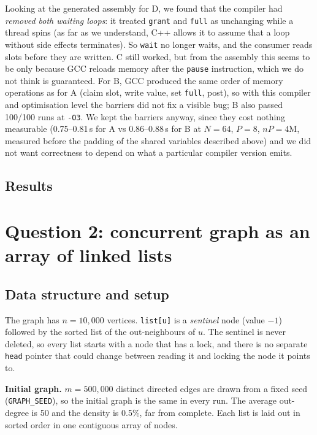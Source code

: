\documentclass[10pt,a4paper]{article}
\begin{document}
Looking at the generated assembly for D, we found that the compiler had \emph{removed both waiting loops}: it treated \texttt{grant} and \texttt{full}
as unchanging while a thread spins (as far as we understand, C++ allows it to assume that a loop without side effects terminates). So \texttt{wait} no longer waits, and the consumer
reads slots before they are written. C still worked, but from the assembly this seems to be only because GCC reloads memory after the \texttt{pause} instruction, which we do not think is guaranteed.
For B, GCC produced the same order of memory operations as for A (claim slot, write value, set \texttt{full}, post), so with this compiler and optimisation level the barriers
did not fix a visible bug; B also passed 100/100 runs at \texttt{-O3}. We kept the barriers anyway, since they cost nothing measurable
(0.75--0.81\,s for A vs 0.86--0.88\,s for B at $N=64$, $P=8$, $nP=4$M, measured before the padding of the shared variables described above) and we did not want correctness to depend on what a particular compiler version emits.

\subsection{Results}


\section{Question 2: concurrent graph as an array of linked lists}

\subsection{Data structure and setup}
The graph has $n = 10{,}000$ vertices. \texttt{list[u]} is a \emph{sentinel} node (value $-1$) followed by the sorted list of the out-neighbours of $u$.
The sentinel is never deleted, so every list starts with a node that has a lock, and there is no separate \texttt{head} pointer that could change
between reading it and locking the node it points to.

\textbf{Initial graph.} $m = 500{,}000$ distinct directed edges are drawn from a fixed seed (\texttt{GRAPH\_SEED}), so the initial graph is the same in every run.
The average out-degree is 50 and the density is 0.5\%, far from complete. Each list is laid out in sorted order in one contiguous array of nodes.
\end{document}
